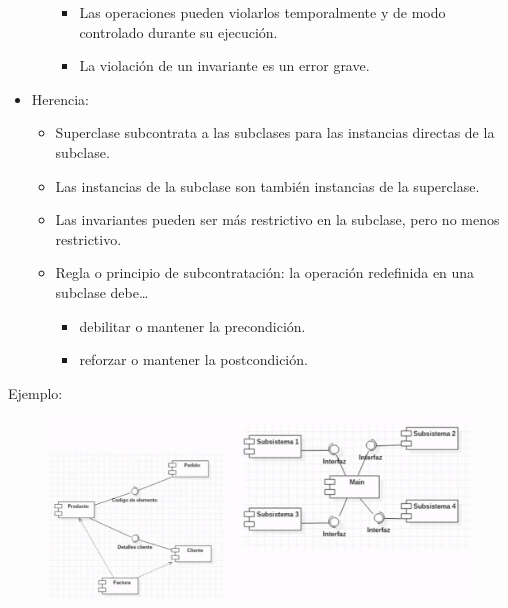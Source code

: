\documentclass[12pt, twoside, openright]{report} %
\begin{document}
\begin{itemize}
\begin{itemize}
        \begin{itemize}
        
        \item
          Las operaciones pueden violarlos temporalmente y de modo
          controlado durante su ejecución.
        \item
          La violación de un invariante es un error grave.
        \end{itemize}
      \end{itemize}
	\pagebreak
    \item
      Herencia:

      \begin{itemize}
      
      \item
        Superclase subcontrata a las subclases para las instancias
        directas de la subclase.
      \item
        Las instancias de la subclase son también instancias de la
        superclase.
      \item
        Las invariantes pueden ser más restrictivo en la subclase, pero
        no menos restrictivo.
      \item
        Regla o principio de subcontratación: la operación redefinida en
        una subclase debe\ldots{}

        \begin{itemize}
			\item
			debilitar o mantener la precondición.
			\item
			reforzar o mantener la postcondición.
        \end{itemize}
      
      \end{itemize}
    \end{itemize}

	Ejemplo:
	\begin{figure}[H]
		{\includegraphics[scale=.3]{Untitled 44.png}}
	\end{figure}
\end{document}
